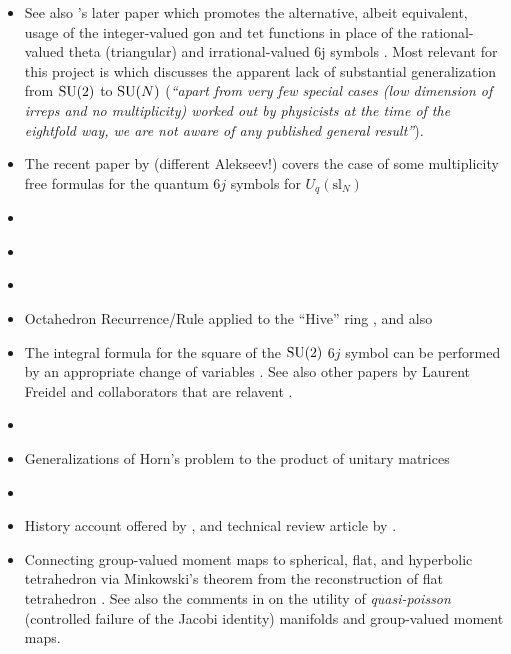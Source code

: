\documentclass[notitlepage]{article}
\begin{document}
\begin{itemize}
    \item See also 's later paper which promotes the alternative, albeit equivalent, usage of the integer-valued $\mathrm{gon}$ and $\mathrm{tet}$ functions in place of the rational-valued theta (triangular) and irrational-valued 6j symbols \cite{coquereaux2023integer}. Most relevant for this project is \cite[Section IV D]{coquereaux2023integer} which discusses the apparent lack of substantial generalization from $\operatorname{SU}(2)$ to $\operatorname{SU}(N)$ (\textit{``apart from very few special cases (low dimension of irreps and no multiplicity) worked out by physicists at the time of the eightfold way, we are not aware of any published general result''}).
    \item The recent paper by \citeauthor{alekseev2020multiplicity} (different Alekseev!) covers the case of some multiplicity free formulas for the quantum $6j$ symbols for $U_q(\mathrm{sl}_{N})$ \cite{alekseev2020multiplicity}
    \item \citeauthor{boalch2007regge} \cite{boalch2007regge}
    \item \citeauthor{taylor2006sixj} \cite{taylor2006sixj}
    \item \citeauthor{henriques2005crystals} \cite{henriques2005crystals}
    \item Octahedron Recurrence/Rule \citeauthor{robbins1986determinants} \cite{robbins1986determinants} applied to the ``Hive'' ring \citeauthor{knutson2003positive} \cite{knutson2003positive}, and also \citeauthor{henriques2006octahedron} \cite{henriques2006octahedron}
    \item The integral formula for the square of the $\operatorname{SU}(2)$ $6j$ symbol can be performed by an appropriate change of variables \cite{freidel2003asymptotics}. See also other papers by Laurent Freidel and collaborators that are relavent \cite{freidel2000simple,freidel20076j,freidel2010holomorphic}.
    \item \citeauthor{speyer2005horn} \cite{speyer2005horn}
    \item Generalizations of Horn's problem to the product of unitary matrices \cite{agnihotri1997eigenvalues,belkale2008quantum,belkale2016multiplicative}
    \item \citeauthor{bhatia2001linear} \cite{bhatia2001linear}
    \item History account offered by \citeauthor{daftuar2005quantum} \cite{daftuar2005quantum}, and technical review article by \citeauthor{fulton2000eigenvalues} \cite{fulton2000eigenvalues}.
    \item Connecting group-valued moment maps to spherical, flat, and hyperbolic tetrahedron via Minkowski's theorem from the reconstruction of flat tetrahedron \citeauthor{haggard2016encoding}. See also the comments in \cite[Section 11]{haggard2016encoding} on the utility of \textit{quasi-poisson} (controlled failure of the Jacobi identity) manifolds and group-valued moment maps.

\end{itemize}
\end{document}
